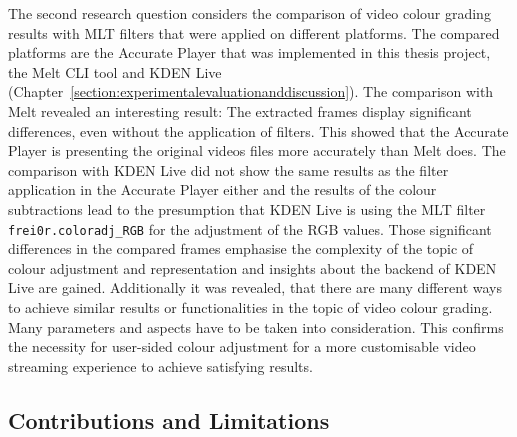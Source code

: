 \documentclass[../MasterThesis.tex]{subfiles}
\begin{document}
The second research question considers the comparison of video colour grading results with MLT filters that were applied on different platforms. The compared platforms are the Accurate Player that was implemented in this thesis project, the Melt CLI tool and KDEN Live (Chapter~\ref{section:experimentalevaluationanddiscussion}).
%
%
The comparison with Melt revealed an interesting result: The extracted frames display significant differences, even without the application of filters. This showed that the Accurate Player is presenting the original videos files more accurately than Melt does.
The comparison with KDEN Live did not show the same results as the filter application in the Accurate Player either and the results of the colour subtractions lead to the presumption that KDEN Live is using the MLT filter \texttt{frei0r.coloradj\_RGB} for the adjustment of the RGB values.
%
Those significant differences in the compared frames emphasise the complexity of the topic of colour adjustment and representation and insights about the backend of KDEN Live are gained. 
%
%
Additionally it was revealed, that there are many different ways to achieve similar results or functionalities in the topic of video colour grading. Many parameters and aspects have to be taken into consideration. This confirms the necessity for user-sided colour adjustment for a more customisable video streaming experience to achieve satisfying results. 





\subsection{Contributions and Limitations} \label{subsection:contributionslimitations}
\end{document}
